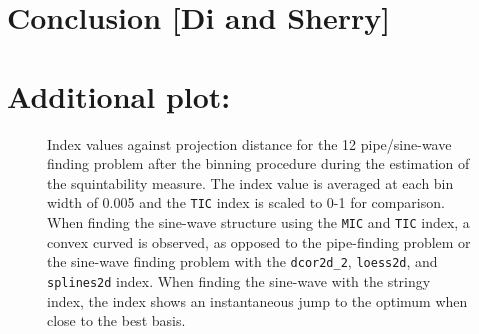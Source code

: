 \documentclass[
  number,
  preprint,
  3p]{elsarticle}
\begin{document}
\section{Conclusion {[}Di and Sherry{]}}\label{sec-conclusion}

\section{Additional plot:}\label{additional-plot}

\begin{figure}


\caption{\label{fig-idx-proj-dist}Index values against projection
distance for the 12 pipe/sine-wave finding problem after the binning
procedure during the estimation of the squintability measure. The index
value is averaged at each bin width of 0.005 and the \texttt{TIC} index
is scaled to 0-1 for comparison. When finding the sine-wave structure
using the \texttt{MIC} and \texttt{TIC} index, a convex curved is
observed, as opposed to the pipe-finding problem or the sine-wave
finding problem with the \texttt{dcor2d\_2}, \texttt{loess2d}, and
\texttt{splines2d} index. When finding the sine-wave with the stringy
index, the index shows an instantaneous jump to the optimum when close
to the best basis.}

\end{figure}%


\renewcommand\refname{References}
  
\end{document}
